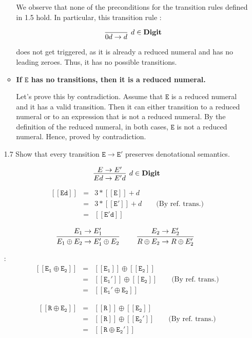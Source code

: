 \documentclass[a4paper,10pt]{article}
\newcommand{\E}{\mathtt{E}}
\newcommand{\Digit}{\mathbf{Digit}}
\newcommand{\denot}[1]{\mathtt{[[{#1}]]}}
\newcommand{\question}[1]
{\color{DarkBlue}#1 \color{Black} \newline}
\begin{document}
\begin{enumerate}
\begin{itemize}
	We observe that none of the preconditions for the transition rules defined in
	1.5 hold. In particular, this transition rule :
	
	\[
	\infer[d \in \Digit]
  	{0d \rightarrow d}
  	{}
  	\] 
  	
  	does not get triggered, as it is already a reduced numeral and has
  	no leading zeroes. Thus, it has no possible transitions.
	
	\item {\textbf{If $\E$ has no transitions, then it is a reduced numeral.}}
	
	Let's prove this by contradiction. Assume that $\E$ is a reduced numeral and it
	has a valid transition.
	Then it can either transition to a reduced numeral or to an expression 
	that is not a reduced numeral. By the definition of	the reduced numeral,
	in both cases, $\E$ is not a reduced numeral. Hence, proved by contradiction.

\end{itemize}

\question{
\item[1.7] Show that every transition $\E \to \E'$ preserves denotational semantics.
}

\[
\infer[d \in \Digit]
  {Ed \rightarrow E'd}
  {E \rightarrow E'}
\]

\proof
\begin{eqnarray*}
\denot{Ed}  
            & = &  3 * \denot{E} + d  \\
            & = &  3 * \denot{E'} + d \qquad \text{(By ref. trans.)} \\ 
            & = & \denot{E'd} 
\end{eqnarray*}

\[
\infer[]
  {E_{1} \oplus E_{2} \rightarrow E_{1}' \oplus E_{2}}
  {E_{1} \rightarrow E_{1}'} \qquad
\infer[]
  {R \oplus E_{2} \rightarrow R \oplus E_{2}'}
  {E_{2} \rightarrow E_{2}'}
\]

\proof:
\begin{eqnarray*}
\denot{E_{1} \oplus E_{2}}  
            & = &  \denot{E_{1}} \oplus \denot{E_{2}} \\
            & = &  \denot{E_{1}'} \oplus \denot{E_{2}}  
            \qquad \text{(By ref. trans.)}
            \\ 
            & = & \denot{E_{1}' \oplus E_{2}} 
\end{eqnarray*}

\begin{eqnarray*}
\denot{R \oplus E_{2}}  
            & = &  \denot{R} \oplus \denot{E_{2}} \\
            & = &  \denot{R} \oplus \denot{E_{2}'}  
            \qquad \text{(By ref. trans.)} \\
            & = & \denot{{R} \oplus E_{2}'} 
\end{eqnarray*}


\end{enumerate}
\end{document}
